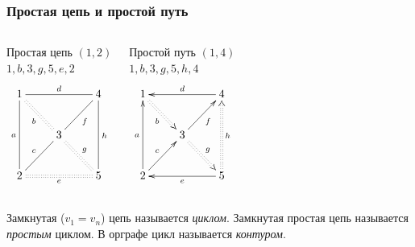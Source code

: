 \begin{frame}
    \frametitle{Простая цепь и простой путь}

    \begin{columns}
            \begin{block}{Простая цепь $(1,2)$\\$1,b,3,g,5,e,2$}
                \[
                    {\xymatrix{
                        1 \ar@{-}[dd]_{a} \ar@{-}[rr]^{d} \ar@{:}[dr]_{b}
                            &*{}
                                &4 \ar@{-}[dd]^{h}
                                    \\
                        *{} 
                            &3 \ar@{-}[ur]_{f} \ar@{:}[dr]^{g}
                                &*{}
                                    \\
                        2  \ar@{-}[ur]^{c} \ar@{:}[rr]_{e}
                            &*{}
                                &5
                    }}
                \]
            \end{block}
        
            \begin{block}{Простой путь $(1,4)$\\$1,b,3,g,5,h,4$}
                \[
                    {\xymatrix{
                        1 \ar@{<-}[dd]_{a} \ar@{<-}[rr]^{d} \ar@{:>}[dr]_{b}
                            &*{}
                                &4 \ar@{<:}[dd]^{h}
                                    \\
                        *{} 
                            &3 \ar@{->}[ur]_{f} \ar@{:>}[dr]^{g}
                                &*{}
                                    \\
                        2  \ar@{->}[ur]^{c} \ar@{<-}[rr]_{e}
                            &*{}
                                &5
                    }}
                \]
            \end{block}
    \end{columns}
\end{frame}

Замкнутая ($v_1=v_n$) цепь называется \emph{циклом}. Замкнутая простая цепь называется \emph{простым} циклом. В орграфе цикл называется \emph{контуром}.

